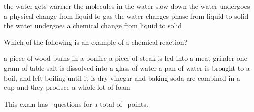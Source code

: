 \documentclass[11pt,addpoints]{exam}   	%
\begin{document}
\begin{questions}
\begin{choices}
\choice the water gets warmer
\choice the molecules in the water slow down
\choice the water undergoes a physical change from liquid to gas
\choice the water changes phase from liquid to solid
\choice the water undergoes a chemical change from liquid to solid
\end{choices}

\question[5]
Which of the following is an example of a chemical reaction?

\begin{choices}
\choice a piece of wood burns in a bonfire
\choice a piece of steak is fed into a meat grinder
\choice one gram of table salt is dissolved into a glass of water
\choice a pan of water is brought to a boil, and left boiling until it is dry
\choice vinegar and baking soda are combined in a cup and they produce a whole lot of foam
\end{choices}

\end{questions}

\begin{center}
This exam has \numquestions\ questions for a total of \numpoints\ points.
\end{center}
\end{document}
